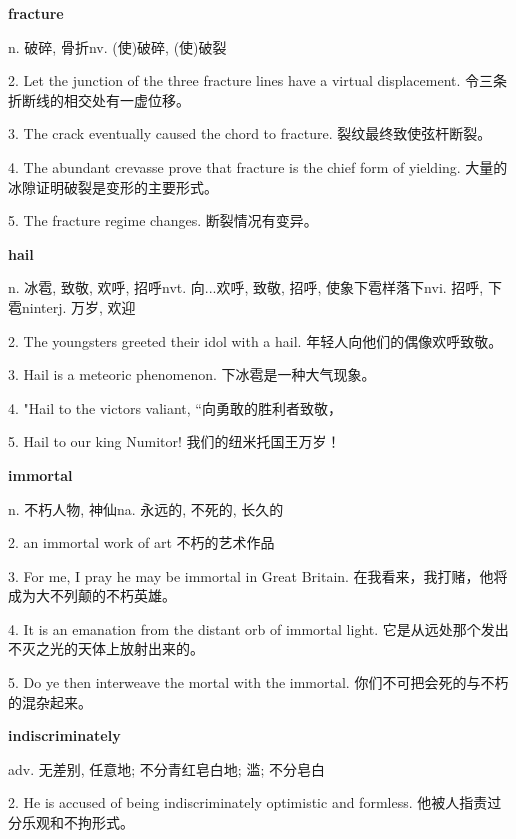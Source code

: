 \documentclass[12pt]{book}
\begin{document}
\vspace{12pt}

\textbf{fracture}

n. 破碎, 骨折nv. (使)破碎, (使)破裂

2.  Let the junction of the three fracture lines have a virtual displacement.  令三条折断线的相交处有一虚位移。 


3.  The crack eventually caused the chord to fracture.  裂纹最终致使弦杆断裂。 


4.  The abundant crevasse prove that fracture is the chief form of yielding.  大量的冰隙证明破裂是变形的主要形式。 


5.  The fracture regime changes.  断裂情况有变异。 


\vspace{12pt}

\textbf{hail}

n. 冰雹, 致敬, 欢呼, 招呼nvt. 向...欢呼, 致敬, 招呼, 使象下雹样落下nvi. 招呼, 下雹ninterj. 万岁, 欢迎

2.  The youngsters greeted their idol with a hail.  年轻人向他们的偶像欢呼致敬。 


3.  Hail is a meteoric phenomenon.  下冰雹是一种大气现象。 


4.  "Hail to the victors valiant,  “向勇敢的胜利者致敬， 


5.  Hail to our king Numitor!  我们的纽米托国王万岁！ 


\vspace{12pt}

\textbf{immortal}

n. 不朽人物, 神仙na. 永远的, 不死的, 长久的

2.  an immortal work of art  不朽的艺术作品 


3.  For me, I pray he may be immortal in Great Britain.  在我看来，我打赌，他将成为大不列颠的不朽英雄。 


4.  It is an emanation from the distant orb of immortal light.  它是从远处那个发出不灭之光的天体上放射出来的。 


5.  Do ye then interweave the mortal with the immortal.  你们不可把会死的与不朽的混杂起来。 


\vspace{12pt}

\textbf{indiscriminately}

adv. 无差别, 任意地; 不分青红皂白地; 滥; 不分皂白

2.  He is accused of being indiscriminately optimistic and formless.  他被人指责过分乐观和不拘形式。 
\end{document}
